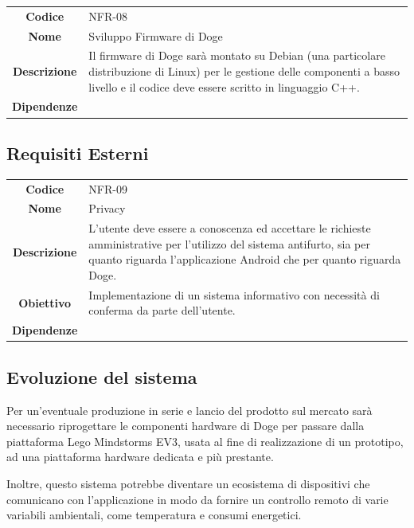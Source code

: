 \documentclass{article}
\begin{document}
    \begin{adjustbox}{center}
    \begin{tabular}{|c|p{10cm}|}
    \hline
    \textbf{Codice} & NFR-08 \\
    \textbf{Nome} & Sviluppo Firmware di Doge \\
    \textbf{Descrizione} & Il firmware di Doge sarà montato su Debian (una particolare distribuzione di Linux) per le gestione delle componenti a basso livello e il codice deve essere scritto in linguaggio C++. \\
    \textbf{Dipendenze} &  \\
    \hline
    \end{tabular}
    \end{adjustbox}
    
    \subsection{Requisiti Esterni}
    
    \begin{adjustbox}{center}
    \begin{tabular}{|c|p{10cm}|}
    \hline
    \textbf{Codice} & NFR-09 \\
    \textbf{Nome} & Privacy \\
    \textbf{Descrizione} & L'utente deve essere a conoscenza ed accettare le richieste amministrative per l'utilizzo del sistema antifurto, sia per quanto riguarda l'applicazione Android che per quanto riguarda Doge. \\
    \textbf{Obiettivo} & Implementazione di un sistema informativo con necessità di conferma da parte dell'utente. \\
    \textbf{Dipendenze} &  \\
    \hline
    \end{tabular}
    \end{adjustbox}
    
    \subsection{Evoluzione del sistema}
    
    Per un'eventuale produzione in serie e lancio del prodotto sul mercato sarà necessario riprogettare le componenti hardware di Doge per passare dalla piattaforma Lego Mindstorms EV3, usata al fine di realizzazione di un prototipo, ad una piattaforma hardware dedicata e più prestante.
    
    Inoltre, questo sistema potrebbe diventare un ecosistema di dispositivi che comunicano con l'applicazione in modo da fornire un controllo remoto di varie variabili ambientali, come temperatura e consumi energetici.
    
\end{document}
